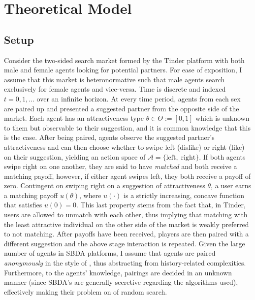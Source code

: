 \section{Theoretical Model}
\label{sec: model}
\subsection{Setup} 
Consider the two-sided search market formed by the Tinder platform with both male and female agents looking for potential partners. For ease of exposition, I assume that this market is heteronormative such that male agents search exclusively for female agents and vice-versa. Time is discrete and indexed $t=0,1,...$ over an infinite horizon. At every time period, agents from each sex are paired up and presented a suggested partner from the opposite side of the market. Each agent has an attractiveness type $\theta \in \Theta := [0,1]$ which is unknown to them but observable to their suggestion, and it is common knowledge that this is the case. After being paired, agents observe the suggested partner's attractiveness and can then choose whether to swipe left (dislike) or right (like) on their suggestion, yielding an action space of $\mathcal{A}=\{ \text{left},\; \text{right}\}$. If both agents swipe right on one another, they are said to have \textit{matched} and both receive a matching payoff, however, if either agent swipes left, they both receive a payoff of zero. Contingent on swiping right on a suggestion of attractiveness $\theta$, a user earns a matching payoff $u(\theta)$, where $u(\cdot)$ is a strictly increasing, concave function that satisfies $u(0) = 0$. This last property stems from the fact that, in Tinder, users are allowed to unmatch with each other, thus implying that matching with the least attractive individual on the other side of the market is weakly preferred to not matching. After payoffs have been received, players are then paired with a different suggestion and the above stage interaction is repeated. Given the large number of agents in SBDA platforms, I assume that agents are paired \textit{anonymously} in the style of \cite{jovanovic1988anonymous}, thus abstracting from history-related complexities. Furthermore, to the agents' knowledge, pairings are decided in an unknown manner (since SBDA's are generally secretive regarding the algorithms used), effectively making their problem on of random search.

